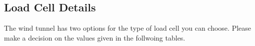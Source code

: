 \documentclass[12pt]{report} %
\begin{document}
\subsection{Load Cell Details}

The wind tunnel has two options for the type of load cell you can choose. Please make a decision on the values given in the follwoing tables.
\\
\begin{table}[htbp]
  \centering
  \caption{Load Cell Selection: Sensing Ranges}
  \label{tab:var}
\end{table}


\begin{table}[htbp]
  \centering
  \caption{Load Cell Selection: Sensing Ranges}
  \label{tab:var}
\end{table}
\end{document}
